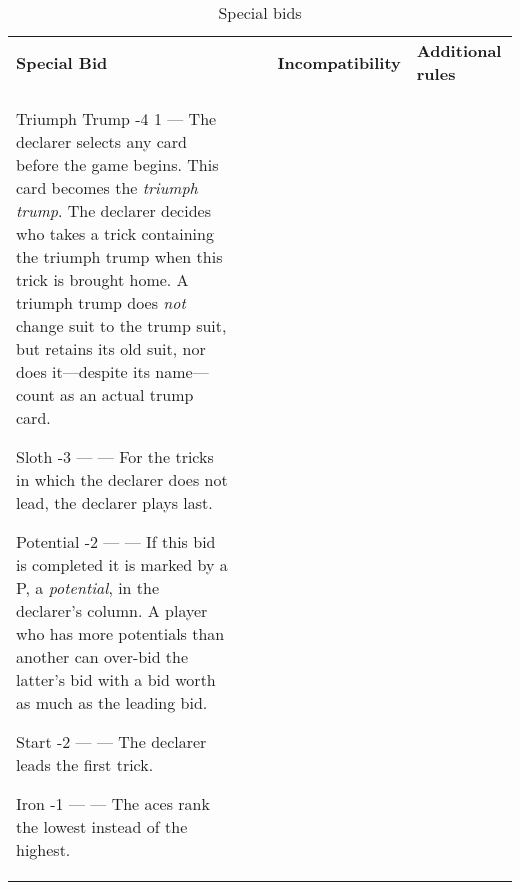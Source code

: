 %
%
%
%

\newcommand{\nonTrump}{\textnormal{non-trump bids}}

\begin{table}
	\caption{Special bids}\label{tab:specialBids}
	\begin{center}
		\begin{tabularx}{\textwidth}{
			l
			S[table-number-alignment=center, table-format=1.0]
			S[table-number-alignment=center, table-format=1.0]
			p{3cm}
			|X
		}
			\textbf{Special Bid} &
			 &
			 &
			\textbf{Incompatibility} &
			\textbf{Additional rules}
			\\[-3ex]

			\specialBidItem%
			{Triumph Trump}
			{-4}
			{1}
			{---}
			{%
				The declarer selects any card before the game begins. This card becomes the \emph{triumph trump}. The declarer decides who takes a trick containing the triumph trump when this trick is brought home. A triumph trump does \emph{not} change suit to the trump suit, but retains its old suit, nor does it---despite its name---count as an actual trump card.
			}

			\specialBidItem%
			{Sloth}
			{-3}
			{{---}}
			{---}
			{%
				For the tricks in which the declarer does not lead, the declarer plays last.
			}

			\specialBidItem%
			{Potential}
			{-2}
			{{---}}
			{---}
			{%
				If this bid is completed it is marked by a P, a \emph{potential}, in the declarer's column. A player who has more potentials than another can over-bid the latter's bid with a bid worth as much as the leading bid.
			}

			\specialBidItem%
			{Start}
			{-2}
			{{---}}
			{---}
			{%
				The declarer leads the first trick.
			}

			\specialBidItem%
			{Iron}
			{-1}
			{{---}}
			{---}
			{%
				The aces rank the lowest instead of the highest.
			}


\end{tabularx}
\end{center}
\end{table}
